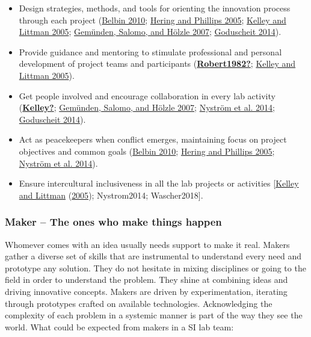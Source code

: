 \documentclass[AMA,STIX1COL,APA,STIX2COL]{WileyNJD-v2}
\providecommand{\tightlist}{%
  \setlength{\itemsep}{0pt}\setlength{\parskip}{0pt}}
\begin{document}
\begin{itemize}
\tightlist
\item
  Design strategies, methods, and tools for orienting the innovation
  process through each project
  (\protect\hyperlink{ref-Belbin2010}{Belbin 2010};
  \protect\hyperlink{ref-Hering2005}{Hering and Phillips 2005};
  \protect\hyperlink{ref-Kelley2005}{Kelley and Littman 2005};
  \protect\hyperlink{ref-Gemunden2007}{Gemünden, Salomo, and Hölzle
  2007}; \protect\hyperlink{ref-Goduscheit2014}{Goduscheit 2014}).
\item
  Provide guidance and mentoring to stimulate professional and personal
  development of project teams and participants
  (\protect\hyperlink{ref-Robert1982}{\textbf{Robert1982?}};
  \protect\hyperlink{ref-Kelley2005}{Kelley and Littman 2005}).
\item
  Get people involved and encourage collaboration in every lab activity
  (\protect\hyperlink{ref-Kelley}{\textbf{Kelley?}};
  \protect\hyperlink{ref-Gemunden2007}{Gemünden, Salomo, and Hölzle
  2007}; \protect\hyperlink{ref-Nystrom2014}{Nyström et al. 2014};
  \protect\hyperlink{ref-Goduscheit2014}{Goduscheit 2014}).
\item
  Act as peacekeepers when conflict emerges, maintaining focus on
  project objectives and common goals
  (\protect\hyperlink{ref-Belbin2010}{Belbin 2010};
  \protect\hyperlink{ref-Hering2005}{Hering and Phillips 2005};
  \protect\hyperlink{ref-Nystrom2014}{Nyström et al. 2014}).
\item
  Ensure intercultural inclusiveness in all the lab projects or
  activities {[}\protect\hyperlink{ref-Kelley2005}{Kelley and Littman}
  (\protect\hyperlink{ref-Kelley2005}{2005}); Nystrom2014;
  Wascher2018{]}.
\end{itemize}

\hypertarget{maker-the-ones-who-make-things-happen}{%
\subsubsection{Maker -- The ones who make things
happen}\label{maker-the-ones-who-make-things-happen}}

Whomever comes with an idea usually needs support to make it real.
Makers gather a diverse set of skills that are instrumental to
understand every need and prototype any solution. They do not hesitate
in mixing disciplines or going to the field in order to understand the
problem. They shine at combining ideas and driving innovative concepts.
Makers are driven by experimentation, iterating through prototypes
crafted on available technologies. Acknowledging the complexity of each
problem in a systemic manner is part of the way they see the world. What
could be expected from makers in a SI lab team:
\end{document}
